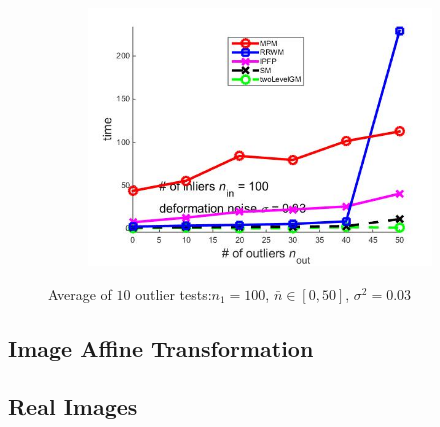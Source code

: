 \documentclass[
	fontsize=12pt,
	paper=a4,
	twoside=false,
	numbers=noenddot,
	plainheadsepline,
	toc=listof,
	toc=bibliography
]{scrartcl}
\begin{document}
\begin{figure}[h]
\begin{subfigure}[b]{0.3\textwidth}
		\includegraphics[scale=0.25]{"fig_ver2108/syntheticPointSets/outliertest_n50/time_avg10tests"} 
	\end{subfigure} 	
	\caption{ Average of $10$ outlier tests:$n_1=100$, $\bar{n}\in[0,50]$, $\sigma^2=0.03$}
	\label{fig:outlier_test2}
\end{figure}

\FloatBarrier

\subsection{Image Affine Transformation}


\subsection{Real Images}


	
\end{document}
